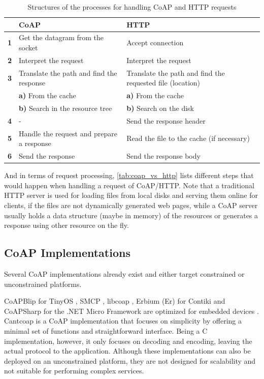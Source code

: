 \begin{table}[!htbp]
\centering
\begin{tabular}{lll}
%
 & \bfseries CoAP &  \bfseries HTTP \\ \hline
\bfseries 1 & Get the datagram from the socket & Accept connection \\
\bfseries 2 & Interpret the request & Interpret the request \\
\bfseries 3 & Translate the path and find the response & Translate the path and find the requested file (location) \\
%
& \textbf{a)} From the cache & \textbf{a)} From the cache \\
%
& \textbf{b)} Search in the resource tree & \textbf{b)} Search on the disk \\
\bfseries 4 & - & Send the response header \\
\bfseries 5 & Handle the request and prepare a response & Read the file to the cache (if necessary) \\
\bfseries 6 & Send the response & Send the response body \\
\end{tabular}
\caption{Structures of the processes for handling CoAP and HTTP requests}
\label{tab:coap_vs_http}
\end{table}

And in terms of request processing, \autoref{tab:coap_vs_http} \cite{lanter2013scalability} lists different steps that would happen when handling a request of CoAP/HTTP. Note that a traditional HTTP server is used for loading files from local disks and serving them online for clients, if the files are not dynamically generated web pages, while a CoAP server usually holds a data structure (maybe in memory) of the resources or generates a response using other resource on the fly.  

\subsection{CoAP Implementations}\label{CoAP_imp}

Several CoAP implementations already exist and either target constrained or unconstrained platforms. 

CoAPBlip for TinyOS \cite{6208761}, SMCP \cite{SMCP}, libcoap \cite{kuladinithi2011implementation}, Erbium (Er) for Contiki \cite{kovatsch2011low} and CoAPSharp \cite{coapsharp} for the .NET Micro Framework are optimized for embedded devices \cite{lanter2013scalability}. Cantcoap \cite{cantcoap} is a CoAP implementation that focuses on simplicity by offering a minimal set of functions and straightforward interface. Being a C implementation, however, it only focuses on decoding and encoding, leaving the actual protocol to the application. Although these implementations can also be deployed on an unconstrained platform, they are not designed for scalability and not suitable for performing complex services.


